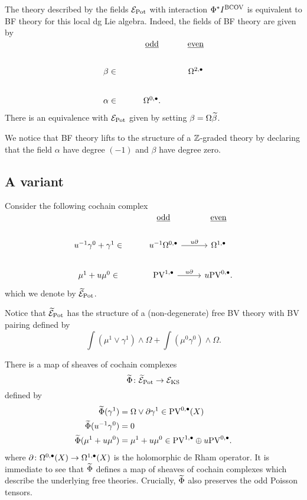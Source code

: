 \documentclass[11pt]{amsart}
\def\PV{{\rm PV}}
\begin{document}
The theory described by the fields $\cE_{\rm Pot}$ with interaction $\Phi^*I^{\rm BCOV}$ is equivalent to BF theory for this local dg Lie algebra. 
Indeed, the fields of BF theory are given by
\[
\begin{tikzcd}
& \ul{\rm odd} & \ul{\rm even} \\
\beta \in & & \Omega^{2,\bu} \\
\alpha \in & \Omega^{0,\bu}   .
\end{tikzcd}
\]
There is an equivalence with $\cE_{\rm Pot}$ given by setting $\beta = \Omega \Tilde{\beta}$.  

\begin{rmk}
We notice that BF theory lifts to the structure of a $\ZZ$-graded theory by declaring that the field $\alpha$ have degree $(-1)$ and $\beta$ have degree zero. 
\end{rmk}

\subsection{A variant}
Consider the following cochain complex 
\[
\begin{tikzcd}
& \ul{\rm odd} & \ul{\rm even} \\
u^{-1} \gamma^0 + \gamma^1 \in & u^{-1} \Omega^{0,\bu}  \ar[r,"u \partial"] & \Omega^{1,\bu} \\
\mu^1 + u \mu^0 \in & \PV^{1,\bu} \ar[r, "u \partial"] & u \PV^{0,\bu} .
\end{tikzcd}
\]
which we denote by $\Tilde{\cE}_{\rm Pot}$. 

Notice that $\Tilde{\cE}_{\rm Pot}$ has the structure of a (non-degenerate) free BV theory with BV pairing defined by
\[
\int (\mu^1 \vee \gamma^1) \wedge \Omega + \int (\mu^0 \gamma^0) \wedge \Omega .
\]

There is a map of sheaves of cochain complexes
\[
\Tilde{\Phi} \colon \Tilde{\cE}_{\rm Pot} \to \cE_{\rm KS}
\]
defined by
\begin{align*}
\Tilde{\Phi} (\gamma^1) & = \Omega \vee \partial \gamma^1 \in \PV^{0,\bu}(X) \\
\Tilde{\Phi} (u^{-1}\gamma^0) & = 0 \\
\Tilde{\Phi}(\mu^1 + u \mu^0 ) & =  \mu^1 + u \mu^0 \in \PV^{1,\bu} \oplus u \PV^{0,\bu} .
\end{align*}
where $\partial \colon \Omega^{0,\bu}(X) \to \Omega^{1,\bu}(X)$ is the holomorphic de Rham operator. 
It is immediate to see that $\Tilde{\Phi}$ defines a map of sheaves of cochain complexes which describe the underlying free theories. 
Crucially, $\Tilde{\Phi}$ also preserves the odd Poisson tensors. 
\end{document}
